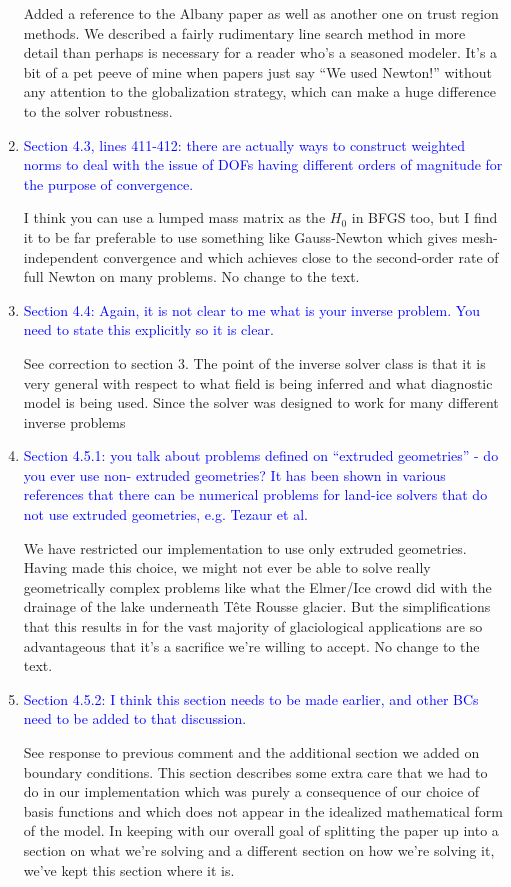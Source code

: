\documentclass{article}
\theoremstyle{definition}
\theoremstyle{plain}
\begin{document}
\begin{enumerate}
Added a reference to the Albany paper as well as another one on trust region methods.
We described a fairly rudimentary line search method in more detail than perhaps is necessary for a reader who's a seasoned modeler.
It's a bit of a pet peeve of mine when papers just say ``We used Newton!'' without any attention to the globalization strategy, which can make a huge difference to the solver robustness.
\item \textcolor{blue}{Section 4.3, lines 411-412: there are actually ways to construct weighted norms to deal with the issue
of DOFs having different orders of magnitude for the purpose of convergence.}

I think you can use a lumped mass matrix as the $H_0$ in BFGS too, but I find it to be far preferable to use something like Gauss-Newton which gives mesh-independent convergence and which achieves close to the second-order rate of full Newton on many problems.
No change to the text.
\item \textcolor{blue}{Section 4.4: Again, it is not clear to me what is your inverse problem. You need to state this explicitly
so it is clear.}

See correction to section 3.
The point of the inverse solver class is that it is very general with respect to what field is being inferred and what diagnostic model is being used.
Since the solver was designed to work for many different inverse problems
\item \textcolor{blue}{Section 4.5.1: you talk about problems defined on ``extruded geometries'' - do you ever use non-
extruded geometries? It has been shown in various references that there can be numerical problems
for land-ice solvers that do not use extruded geometries, e.g. Tezaur et al.}

We have restricted our implementation to use only extruded geometries.
Having made this choice, we might not ever be able to solve really geometrically complex problems like what the Elmer/Ice crowd did with the drainage of the lake underneath T\^ete Rousse glacier.
But the simplifications that this results in for the vast majority of glaciological applications are so advantageous that it's a sacrifice we're willing to accept.
No change to the text.

\item \textcolor{blue}{Section 4.5.2: I think this section needs to be made earlier, and other BCs need to be added to that
discussion.}

See response to previous comment and the additional section we added on boundary conditions.
This section describes some extra care that we had to do in our implementation which was purely a consequence of our choice of basis functions and which does not appear in the idealized mathematical form of the model.
In keeping with our overall goal of splitting the paper up into a section on what we're solving and a different section on how we're solving it, we've kept this section where it is.


\end{enumerate}
\end{document}
